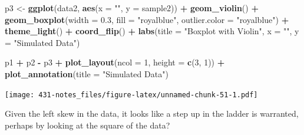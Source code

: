 \documentclass[
]{book}
\newenvironment{Shaded}{\begin{snugshade}}{\end{snugshade}}
\newcommand{\DataTypeTok}[1]{\textcolor[rgb]{0.13,0.29,0.53}{#1}}
\newcommand{\DecValTok}[1]{\textcolor[rgb]{0.00,0.00,0.81}{#1}}
\newcommand{\FloatTok}[1]{\textcolor[rgb]{0.00,0.00,0.81}{#1}}
\newcommand{\KeywordTok}[1]{\textcolor[rgb]{0.13,0.29,0.53}{\textbf{#1}}}
\newcommand{\NormalTok}[1]{#1}
\newcommand{\OperatorTok}[1]{\textcolor[rgb]{0.81,0.36,0.00}{\textbf{#1}}}
\newcommand{\StringTok}[1]{\textcolor[rgb]{0.31,0.60,0.02}{#1}}
\begin{document}
\begin{Shaded}
\begin{Highlighting}[]
\NormalTok{p3 <-}\StringTok{ }\KeywordTok{ggplot}\NormalTok{(data2, }\KeywordTok{aes}\NormalTok{(}\DataTypeTok{x =} \StringTok{""}\NormalTok{, }\DataTypeTok{y =}\NormalTok{ sample2)) }\OperatorTok{+}
\StringTok{    }\KeywordTok{geom_violin}\NormalTok{() }\OperatorTok{+}
\StringTok{    }\KeywordTok{geom_boxplot}\NormalTok{(}\DataTypeTok{width =} \FloatTok{0.3}\NormalTok{, }\DataTypeTok{fill =} \StringTok{"royalblue"}\NormalTok{, }
                 \DataTypeTok{outlier.color =} \StringTok{"royalblue"}\NormalTok{) }\OperatorTok{+}
\StringTok{    }\KeywordTok{theme_light}\NormalTok{() }\OperatorTok{+}
\StringTok{    }\KeywordTok{coord_flip}\NormalTok{() }\OperatorTok{+}
\StringTok{    }\KeywordTok{labs}\NormalTok{(}\DataTypeTok{title =} \StringTok{"Boxplot with Violin"}\NormalTok{,}
         \DataTypeTok{x =} \StringTok{""}\NormalTok{, }\DataTypeTok{y =} \StringTok{"Simulated Data"}\NormalTok{)}

\NormalTok{p1 }\OperatorTok{+}\StringTok{ }\NormalTok{p2 }\OperatorTok{-}\StringTok{ }\NormalTok{p3 }\OperatorTok{+}\StringTok{ }\KeywordTok{plot_layout}\NormalTok{(}\DataTypeTok{ncol =} \DecValTok{1}\NormalTok{, }\DataTypeTok{height =} \KeywordTok{c}\NormalTok{(}\DecValTok{3}\NormalTok{, }\DecValTok{1}\NormalTok{)) }\OperatorTok{+}
\StringTok{    }\KeywordTok{plot_annotation}\NormalTok{(}\DataTypeTok{title =} \StringTok{"Simulated Data"}\NormalTok{)}
\end{Highlighting}
\end{Shaded}

\texttt{[image: 431-notes\_files/figure-latex/unnamed-chunk-51-1.pdf]}

Given the left skew in the data, it looks like a step up in the ladder is warranted, perhaps by looking at the square of the data?
\end{document}
